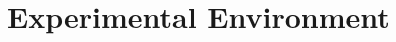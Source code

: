 \documentclass[10pt,conference,compsocconf]{IEEEtran}
\begin{document}
 


   
   
   
   
   
   







\section{Experimental Environment}
\label{sec:exen}
\end{document}
